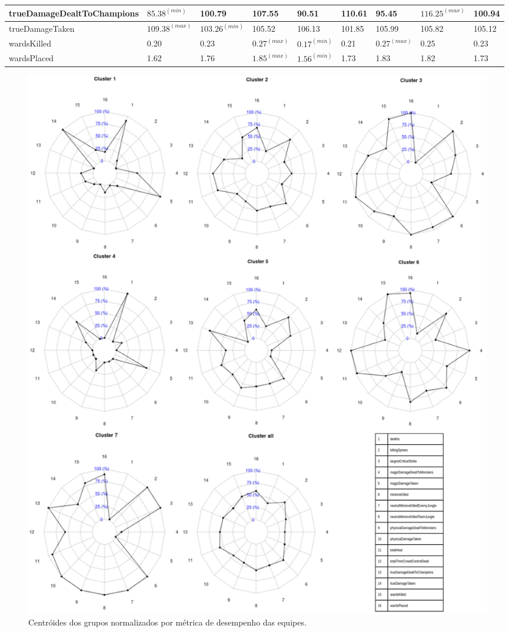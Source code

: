 \begin{table}
\begin{tabular}{lp{}p{}p{}p{}p{}p{}p{}p{}}
trueDamageDealtToChampions&        $85.38^{(min)}$&  100.79&  107.55&   90.51&  110.61&   95.45&   $116.25^{(max)}$&  100.94\\ \hline
trueDamageTaken&                  $109.38^{(max)}$&  $103.26^{(min)}$&  105.52&  106.13&  101.85&  105.99&   105.82&  105.12\\ \hline
wardsKilled&                        0.20&    0.23&    $0.27^{(max)}$&    $0.17^{(min)}$&    0.21&    $0.27^{(max)}$&     0.25&    0.23\\ \hline
wardsPlaced&                        1.62&    1.76&    $1.85^{(max)}$&    $1.56^{(min)}$&    1.73&    1.83&     1.82&    1.73\\
  \bottomrule
\end{tabular}
\end{table}

\begin{figure}
\includegraphics[width=1\textwidth,height=\textheight,keepaspectratio]{radars}
\caption{Centróides dos grupos normalizados por métrica de desempenho das equipes.}
\label{fig:radars}
\end{figure}

